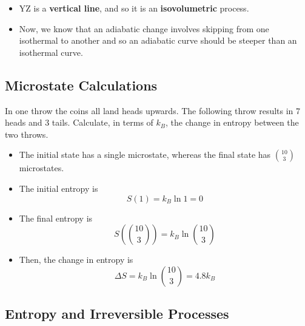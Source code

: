 \documentclass[a4paper,12pt]{article}
\begin{document}
\begin{itemize}
  \item YZ is a \textbf{vertical line}, and so it is an \textbf{isovolumetric} process.
  \item Now, we know that an adiabatic change involves skipping from one isothermal to another and so an adiabatic curve should be steeper than an isothermal curve.
\end{itemize}

\subsection{Microstate Calculations}

In one throw the coins all land heads upwards. The following throw results in 7 heads and 3 tails. Calculate, in terms of $k_B$, the change in entropy between the two throws.
\begin{itemize}
  \item The initial state has a single microstate, whereas the final state has $\binom{10}{3}$ microstates.
  \item The initial entropy is $$S(1) = k_B\ln 1 = 0$$
  \item The final entropy is $$S(\binom{10}{3}) = k_B\ln\binom{10}{3}$$
  \item Then, the change in entropy is $$\Delta S = k_B\ln\binom{10}{3} = 4.8k_B$$
\end{itemize}

\pagebreak

\subsection{Entropy and Irreversible Processes}
\end{document}
